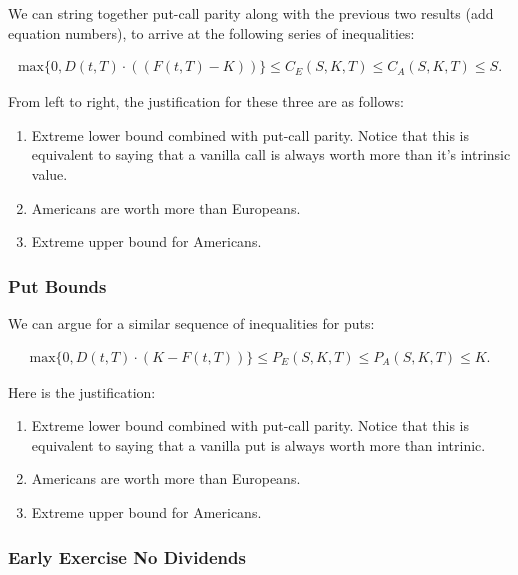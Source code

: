 \documentclass[11pt,]{krantz}
\begin{document}
We can string together put-call parity along with the previous two results (add equation numbers), to arrive at the following series of inequalities:

\begin{align*}
\text{max}\big\{ 0, D(t, T) \cdot ((F(t, T) - K))  \big\} \leq C_E(S, K, T) \leq C_A(S, K, T) \leq S.   
\end{align*}

From left to right, the justification for these three are as follows:

\begin{enumerate}
\def\labelenumi{\arabic{enumi}.}
\item
  Extreme lower bound combined with put-call parity. Notice that this is equivalent to saying that a vanilla call is always worth more than it's intrinsic value.
\item
  Americans are worth more than Europeans.
\item
  Extreme upper bound for Americans.
\end{enumerate}

\subsubsection*{Put Bounds}\label{put-bounds}

We can argue for a similar sequence of inequalities for puts:

\begin{align*}
\text{max}\big\{ 0, D(t, T) \cdot (K - F(t, T))  \big\} \leq P_E(S, K, T) \leq P_A(S, K, T) \leq K. 
\end{align*}

Here is the justification:

\begin{enumerate}
\def\labelenumi{\arabic{enumi}.}
\item
  Extreme lower bound combined with put-call parity. Notice that this is equivalent to saying that a vanilla put is always worth more than intrinic.
\item
  Americans are worth more than Europeans.
\item
  Extreme upper bound for Americans.
\end{enumerate}

\subsubsection*{Early Exercise No Dividends}\label{early-exercise-no-dividends}
\end{document}
